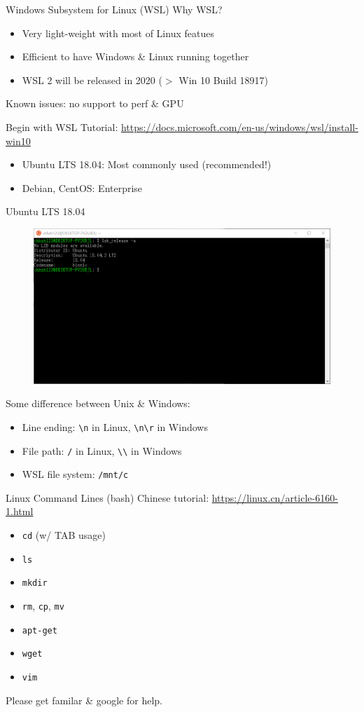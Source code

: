 \documentclass{../TexTemplate/myslide}
\begin{document}
\begin{frame}{Windows Subsystem for Linux (WSL)}
Why WSL?
\begin{itemize}
	\item Very light-weight with most of Linux featues
	\item Efficient to have Windows \& Linux running together
	\item WSL 2 will be released in 2020 ($>$ Win 10 Build 18917)
\end{itemize}
Known issues: no support to perf \& GPU
\end{frame}

\begin{frame}{Begin with WSL}
Tutorial: \url{https://docs.microsoft.com/en-us/windows/wsl/install-win10}
\begin{itemize}
	\item Ubuntu LTS 18.04: Most commonly used (recommended!)
	\item Debian, CentOS: Enterprise
\end{itemize}
\end{frame}

\begin{frame}[fragile]{Ubuntu LTS 18.04}
\begin{figure}
\centering
\includegraphics[width=0.8\linewidth]{fig/ubuntu_ver.png}
\end{figure}
Some difference between Unix \& Windows:
\begin{itemize}
	\item Line ending: \verb'\n' in Linux, \verb'\n\r' in Windows
	\item File path: \verb'/' in Linux, \verb'\\' in Windows
	\item WSL file system: \verb'/mnt/c'
\end{itemize}
\end{frame}

\begin{frame}[fragile]{Linux Command Lines (bash)}
Chinese tutorial: \url{https://linux.cn/article-6160-1.html}
\begin{itemize}
	\item \verb'cd' (w/ TAB usage)
	\item \verb'ls'
	\item \verb'mkdir'
	\item \verb'rm', \verb'cp', \verb'mv'
	\item \verb'apt-get'
	\item \verb'wget'
	\item \verb'vim'
\end{itemize}
Please get familar \& google for help.
\end{frame}
\end{document}
